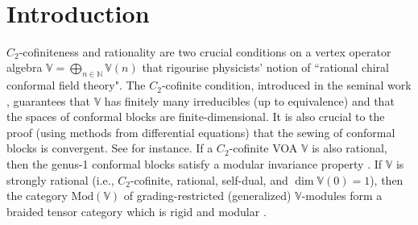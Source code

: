 \documentclass[11pt,b5paper,notitlepage]{article}
\theoremstyle{definition}
\theoremstyle{plain}
\newcommand{\Vbb}{\mathbb V}
\newcommand{\Nbb}{\mathbb N}
\newcommand{\<}{\left\langle}
\renewcommand{\>}{\right\rangle}
\newcommand{\Mod}{\mathrm{Mod}}
\numberwithin{equation}{subsection}
\begin{document}
\tableofcontents




	
	
	
	

	
	

	
	
	
	
	
	
	
	
	

	
{~}\\



\section{Introduction}





$C_2$-cofiniteness and rationality are two crucial conditions on a vertex operator algebra $\Vbb=\bigoplus_{n\in\Nbb}\Vbb(n)$ that rigourise physicists' notion of ``rational chiral conformal field theory". The $C_2$-cofinite condition, introduced in the seminal work \cite{Zhu-modular-invariance}, guarantees that $\Vbb$ has finitely many irreducibles (up to equivalence) and that the spaces of conformal blocks are finite-dimensional. It is also crucial to the proof (using methods from differential equations) that the sewing of conformal blocks is convergent. See \cite{Zhu-modular-invariance,AN03-finite-dimensional,Miy-modular-invariance,Hua-differential-genus-0,Hua-differential-genus-1,NT-P1_conformal_blocks,Fio-genus-1,DGT2,Gui-sewingconvergence} for instance. If a $C_2$-cofinite VOA $\Vbb$ is also rational, then the genus-1 conformal blocks satisfy a modular invariance property \cite{Zhu-modular-invariance,DLM-modular-invariance,Hua-differential-genus-1}. If $\Vbb$ is strongly rational (i.e., $C_2$-cofinite, rational, self-dual, and $\dim\Vbb(0)=1$), then the category $\Mod(\Vbb)$ of grading-restricted (generalized) $\Vbb$-modules form a braided tensor category \cite{HL-tensor-1,HL-tensor-2,HL-tensor-3,Hua-tensor-4,Hua-differential-genus-0,NT-P1_conformal_blocks} which is rigid and modular \cite{Hua-rigidity-modularity}. 
\end{document}
